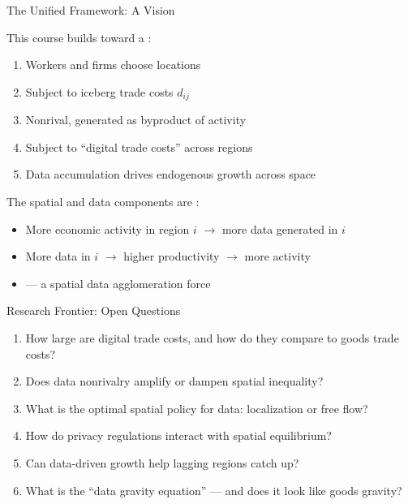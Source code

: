 \documentclass{beamer}
\begin{document}
\begin{frame}{The Unified Framework: A Vision}

    This course builds toward a :

    \vspace{0.5em}
    \begin{enumerate}
        \item {} Workers and firms choose locations
        \item {} Subject to iceberg trade costs $d_{ij}$
        \item {} Nonrival, generated as byproduct of activity
        \item {} Subject to ``digital trade costs'' across regions
        \item {} Data accumulation drives endogenous growth across space
    \end{enumerate}

    \vspace{0.5em}
    The spatial and data components are :
    \begin{itemize}
        \item More economic activity in region $i$ $\rightarrow$ more data generated in $i$
        \item More data in $i$ $\rightarrow$ higher productivity $\rightarrow$ more activity
        \item {} --- a spatial data agglomeration force
    \end{itemize}

    \vspace{0.3em}

\end{frame}

\begin{frame}{Research Frontier: Open Questions}

    \begin{enumerate}
        \item How large are digital trade costs, and how do they compare to goods trade costs?
        \item Does data nonrivalry amplify or dampen spatial inequality?
        \item What is the optimal spatial policy for data: localization or free flow?
        \item How do privacy regulations interact with spatial equilibrium?
        \item Can data-driven growth help lagging regions catch up?
        \item What is the ``data gravity equation'' --- and does it look like goods gravity?
    \end{enumerate}

    \vspace{0.5em}

\end{frame}
\end{document}
